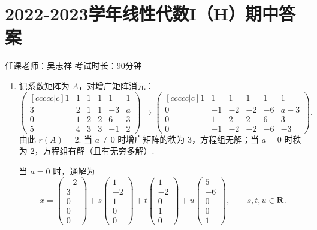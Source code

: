 \section{2022-2023学年线性代数I（H）期中答案}

\begin{center}
    任课老师：吴志祥\hspace{4em} 考试时长：90分钟
\end{center}
\begin{enumerate}
    \item 记系数矩阵为 $A$，对增广矩阵消元：
    \[
        \begin{pmatrix}[ccccc|c]
            1&1&1&1&1&1\\
            3&2&1&1&-3&a\\
            0&1&2&2&6&3\\
            5&4&3&3&-1&2
        \end{pmatrix}
        \longrightarrow
        \begin{pmatrix}[ccccc|c]
            1&1&1&1&1&1\\
            0&-1&-2&-2&-6&a-3\\
            0&1&2&2&6&3\\
            0&-1&-2&-2&-6&-3
        \end{pmatrix}.
    \]
    由此 $r(A)=2$. 当 $a\neq 0$ 时增广矩阵的秩为 $3$，方程组无解；当 $a=0$ 时秩为 $2$，方程组有解（且有无穷多解）.

    当 $a=0$ 时，通解为
    \[
        x=\begin{pmatrix}-2\\3\\0\\0\\0\end{pmatrix}
        +s\begin{pmatrix}1\\-2\\1\\0\\0\end{pmatrix}
        +t\begin{pmatrix}1\\-2\\0\\1\\0\end{pmatrix}
        +u\begin{pmatrix}5\\-6\\0\\0\\1\end{pmatrix},
        \qquad s,t,u\in\mathbf{R}.
    \]


\end{enumerate}
